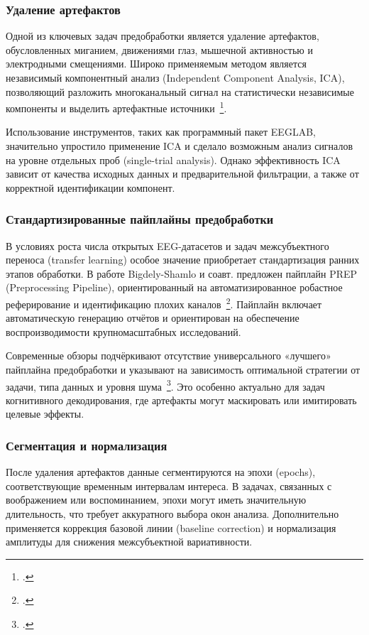 \subsubsection*{Удаление артефактов}

Одной из ключевых задач предобработки является удаление артефактов, обусловленных миганием, движениями глаз, мышечной активностью и электродными смещениями. Широко применяемым методом является независимый компонентный анализ (Independent Component Analysis, ICA), позволяющий разложить многоканальный сигнал на статистически независимые компоненты и выделить артефактные источники~\footcite{10.1016/j.jneumeth.2003.10.009}. 

Использование инструментов, таких как программный пакет EEGLAB, значительно упростило применение ICA и сделало возможным анализ сигналов на уровне отдельных проб (single-trial analysis). Однако эффективность ICA зависит от качества исходных данных и предварительной фильтрации, а также от корректной идентификации компонент.

\subsubsection*{Стандартизированные пайплайны предобработки}

В условиях роста числа открытых EEG-датасетов и задач межсубъектного переноса (transfer learning) особое значение приобретает стандартизация ранних этапов обработки. В работе Bigdely-Shamlo и соавт. предложен пайплайн PREP (Preprocessing Pipeline), ориентированный на автоматизированное робастное реферирование и идентификацию плохих каналов~\footcite{10.3389/fninf.2015.00016}. Пайплайн включает автоматическую генерацию отчётов и ориентирован на обеспечение воспроизводимости крупномасштабных исследований.

Современные обзоры подчёркивают отсутствие универсального «лучшего» пайплайна предобработки и указывают на зависимость оптимальной стратегии от задачи, типа данных и уровня шума~\footcite{10.1109/access.2024.3360328}. Это особенно актуально для задач когнитивного декодирования, где артефакты могут маскировать или имитировать целевые эффекты.

\subsubsection*{Сегментация и нормализация}

После удаления артефактов данные сегментируются на эпохи (epochs), соответствующие временным интервалам интереса. В задачах, связанных с воображением или воспоминанием, эпохи могут иметь значительную длительность, что требует аккуратного выбора окон анализа. Дополнительно применяется коррекция базовой линии (baseline correction) и нормализация амплитуды для снижения межсубъектной вариативности.

